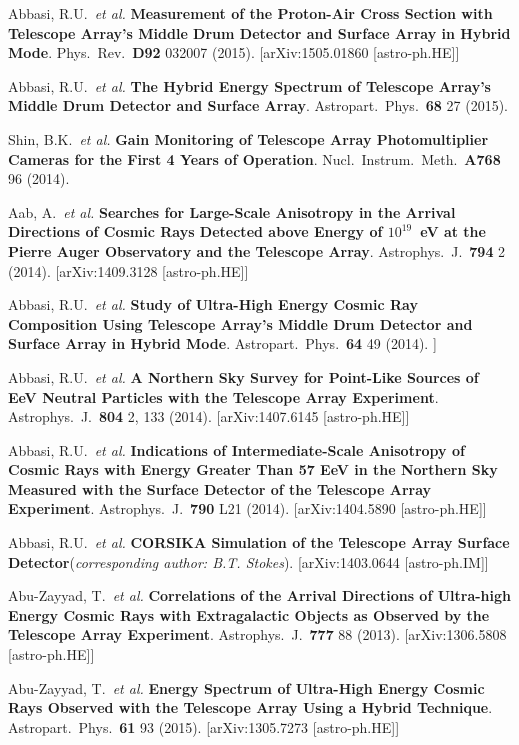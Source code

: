 \begin{resume}
Abbasi, R.U.\ {\it et al.} {\bf Measurement of the Proton-Air Cross Section with Telescope Array’s Middle Drum Detector and Surface Array in Hybrid Mode}. Phys.\ Rev.\ {\bf D92} 032007 (2015).
[arXiv:1505.01860 [astro-ph.HE]]

Abbasi, R.U.\ {\it et al.} {\bf The Hybrid Energy Spectrum of Telescope Array’s Middle Drum Detector and Surface Array}. Astropart.\ Phys.\ {\bf 68} 27 (2015). 

Shin, B.K.\ {\it et al.} {\bf Gain Monitoring of Telescope Array Photomultiplier Cameras for the First 4 Years of Operation}. Nucl.\ Instrum.\ Meth.\ {\bf A768} 96 (2014). 

Aab, A.\ {\it et al.} {\bf Searches for Large-Scale Anisotropy in the Arrival Directions of Cosmic Rays Detected above Energy of \boldmath$10^{19}$~eV at the Pierre Auger Observatory and the Telescope Array}. Astrophys.\ J.\ {\bf 794} 2 (2014). [arXiv:1409.3128 [astro-ph.HE]] 

Abbasi, R.U.\ {\it et al.} {\bf Study of Ultra-High Energy Cosmic Ray Composition Using Telescope Array's Middle Drum Detector and Surface Array in Hybrid Mode}. Astropart.\ Phys.\ {\bf 64} 49 (2014). \newline
[arXiv:1408.1726 [astro-ph.HE]]

Abbasi, R.U.\ {\it et al.} {\bf A Northern Sky Survey for Point-Like Sources of EeV Neutral Particles with the Telescope Array Experiment}. Astrophys.\ J.\ {\bf 804} 2, 133 (2014). [arXiv:1407.6145 [astro-ph.HE]]

Abbasi, R.U.\ {\it et al.} {\bf Indications of Intermediate-Scale Anisotropy of Cosmic Rays with Energy Greater Than 57 EeV in the Northern Sky Measured with the Surface Detector of the Telescope Array Experiment}. Astrophys.\ J.\ {\bf 790} L21 (2014). [arXiv:1404.5890 [astro-ph.HE]]

Abbasi, R.U.\ {\it et al.} {\bf CORSIKA Simulation of the Telescope Array Surface Detector}({\it corresponding author: B.T. Stokes}). [arXiv:1403.0644 [astro-ph.IM]]

Abu-Zayyad, T.\ {\it et al.} {\bf Correlations of the Arrival Directions of Ultra-high Energy Cosmic Rays with Extragalactic Objects as Observed by the Telescope Array Experiment}. Astrophys.\ J.\ {\bf 777} 88 (2013). [arXiv:1306.5808 [astro-ph.HE]]

Abu-Zayyad, T.\ {\it et al.} {\bf Energy Spectrum of Ultra-High Energy Cosmic Rays Observed with the Telescope Array Using a Hybrid Technique}. Astropart.\ Phys.\ {\bf 61} 93 (2015).  [arXiv:1305.7273 [astro-ph.HE]]


\end{resume}
